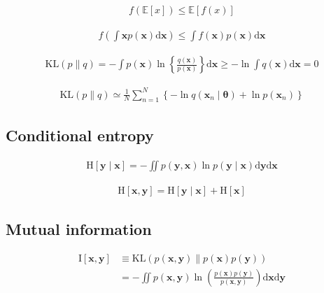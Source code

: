 \documentclass{article}
\begin{document}
\begin{align*}
f(\mathbb{E}[x]) \leqslant \mathbb{E}[f(x)]
\tag{2.103}
\end{align*}

\begin{align*}
f\left(\int \mathbf{x} p(\mathbf{x}) \mathrm{d} \mathbf{x}\right) \leqslant \int f(\mathbf{x}) p(\mathbf{x}) \mathrm{d} \mathbf{x}
\tag{2.104}
\end{align*}

\begin{align*}
\mathrm{KL}(p \| q) = -\int p(\mathbf{x}) \ln \left\{\frac{q(\mathbf{x})}{p(\mathbf{x})}\right\} \mathrm{d} \mathbf{x} \geqslant -\ln \int q(\mathbf{x}) \mathrm{d} \mathbf{x} = 0
\tag{2.105}
\end{align*}

\begin{align*}
\mathrm{KL}(p \| q) \simeq \frac{1}{N} \sum_{n=1}^{N}\left\{-\ln q\left(\mathbf{x}_{n} \mid \boldsymbol{\theta}\right)+\ln p\left(\mathbf{x}_{n}\right)\right\}
\tag{2.106}
\end{align*}

\subsection{Conditional entropy}

\begin{align*}
\mathrm{H}[\mathbf{y} \mid \mathbf{x}] = -\iint p(\mathbf{y}, \mathbf{x}) \ln p(\mathbf{y} \mid \mathbf{x}) \mathrm{d} \mathbf{y} \mathrm{d} \mathbf{x} 
\tag{2.107}
\end{align*}

\begin{align*}
\mathrm{H}[\mathbf{x}, \mathbf{y}] = \mathrm{H}[\mathbf{y} \mid \mathbf{x}] + \mathrm{H}[\mathbf{x}]
\tag{2.108}
\end{align*}

\subsection{Mutual information}

\begin{align*}
\mathrm{I}[\mathbf{x}, \mathbf{y}] & \equiv \mathrm{KL}(p(\mathbf{x}, \mathbf{y}) \| p(\mathbf{x}) p(\mathbf{y})) \\
& = -\iint p(\mathbf{x}, \mathbf{y}) \ln \left(\frac{p(\mathbf{x}) p(\mathbf{y})}{p(\mathbf{x}, \mathbf{y})}\right) \mathrm{d} \mathbf{x} \mathrm{d} \mathbf{y}
\tag{2.109}
\end{align*}
\end{document}

